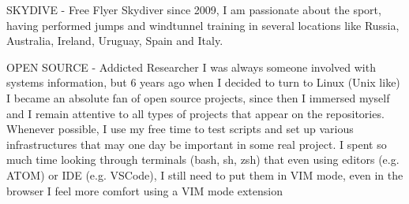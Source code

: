 \newpage
{}

\cvmetaevent
{SKYDIVE - Free Flyer}
{}
{}
{Skydiver since 2009, I am passionate about the sport, having performed
	jumps and windtunnel training in several locations like Russia, Australia,
	Ireland, Uruguay, Spain and Italy.}

\cvmetaevent
{OPEN SOURCE - Addicted Researcher}
{}
{}
{I was always someone involved with systems information, but 6 years ago
	when I decided to turn to Linux (Unix like) I became an absolute fan of
	open source projects, since then I immersed myself and I remain attentive
	to all types of projects that appear on the repositories. Whenever possible,
	I use my free time to test scripts and set up various infrastructures that
	may one day be important in some real project. I spent so much time looking
	through terminals (bash, sh, zsh) that even using editors (e.g. ATOM) or IDE
	(e.g. VSCode), I still need to put them in VIM mode, even in the browser I feel
	more comfort using a VIM mode extension}


\vfill